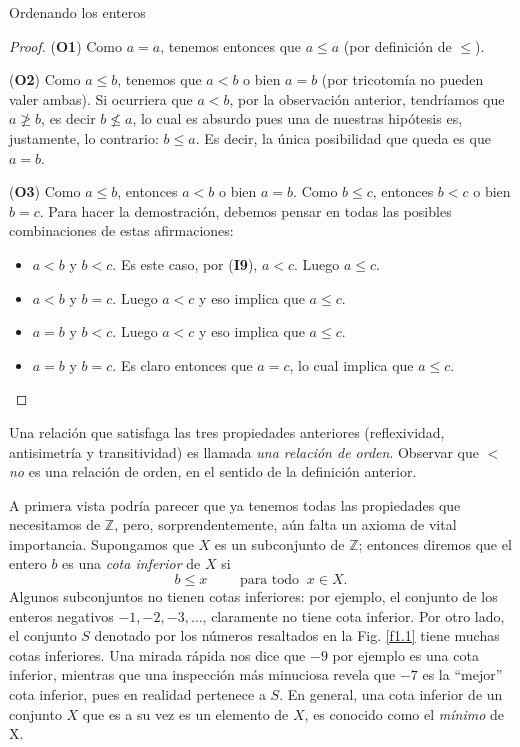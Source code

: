 \begin{section}{Ordenando los enteros}
\begin{ejemplo}
\begin{proof}
(\textbf{O1}) Como $a=a$, tenemos entonces que $a \le a$ (por definición de $\le$).


(\textbf{O2}) Como $a \le b$, tenemos que $a<b$ o bien $a=b$ (por tricotomía no pueden valer ambas). Si ocurriera que $a<b$, por la observación anterior, tendríamos que $a\not\ge b$, es decir $b\not\le a$, lo cual es absurdo pues una de nuestras hipótesis es,  justamente, lo contrario:  $b \le a$.  Es decir, la única posibilidad que queda es que $a=b$.     

(\textbf{O3}) Como $a\le b$, entonces $a <b$ o bien $a=b$. Como $b\le c$, entonces $b<c$ o bien $b=c$. Para hacer la demostración, debemos pensar en todas las posibles combinaciones de estas afirmaciones:
\begin{itemize}
    \item $a<b$ y $b<c$. Es este caso, por  (\textbf{I9}), $a<c$. Luego $a\le c$.
    
    \item $a<b$ y $b=c$. Luego $a<c$ y eso implica que $a\le c$.
    
    \item $a=b$ y $b<c$. Luego $a<c$ y eso implica que $a\le c$.
    
    \item $a=b$ y $b=c$. Es claro entonces que $a=c$, lo cual implica que $a\le c$.
\end{itemize}    
\end{proof}
\end{ejemplo}

Una relación que satisfaga las tres propiedades anteriores (reflexividad, antisimetría y transitividad) es llamada {\em una relación de orden}. Observar que $<$ {\em no} es una relación de orden, en el sentido de la definición anterior. 

A primera vista podría parecer que ya tenemos todas las propiedades que necesitamos de $\mathbb Z$, pero, sorprendentemente, aún falta un axioma de vital importancia. Supongamos que $X$ es un subconjunto de $\mathbb Z$; entonces diremos que el entero $b$ es una {\em cota inferior} de $X$ si
$$
b\le x \qquad \text{ para todo } \ x \in X.
$$
Algunos subconjuntos no tienen cotas inferiores: por ejemplo, el conjunto de los enteros negativos $-1, -2, -3, \ldots$, claramente no tiene cota inferior. Por otro lado, el conjunto $S$ denotado por los números resaltados en la Fig. \ref{f1.1} tiene muchas cotas inferiores. Una mirada rápida nos dice que $-9$ por ejemplo es una cota inferior, mientras que una inspección más minuciosa revela que $-7$ es la ``mejor'' cota inferior, pues en realidad pertenece a $S$. En general, una cota inferior de un conjunto $X$ que es a su vez es un elemento de $X$, es conocido como el {\em mínimo} de X.


\end{section}
